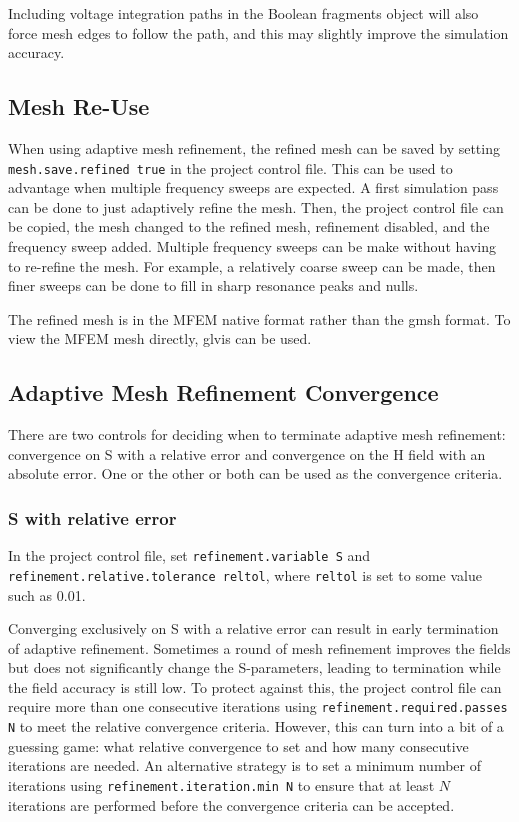 \documentclass[titlepage]{article}
\renewcommand\_{\textunderscore\linebreak[1]}
\begin{document}
Including voltage integration paths in the Boolean fragments object will also force mesh edges to follow the path, and this may slightly improve the simulation accuracy.

\subsection{Mesh Re-Use}

When using adaptive mesh refinement, the refined mesh can be saved by setting \texttt{mesh.save.refined true} in the project control file.  This can be used to advantage when multiple frequency sweeps are expected.  A first simulation pass can be done to just adaptively refine the mesh.  Then, the project control file can be copied, the mesh changed to the refined mesh, refinement disabled, and the frequency sweep added.  Multiple frequency sweeps can be make without having to re-refine the mesh.  For example, a relatively coarse sweep can be made, then finer sweeps can be done to fill in sharp resonance peaks and nulls.

The refined mesh is in the MFEM native format rather than the gmsh format.  To view the MFEM mesh directly, glvis can be used.

\subsection{Adaptive Mesh Refinement Convergence}

There are two controls for deciding when to terminate adaptive mesh refinement: convergence on S with a relative error and convergence on the H field with an absolute error.  One or the other or both can be used as the convergence criteria.

\subsubsection{S with relative error}

In the project control file, set \texttt{refinement.variable S} and \texttt{refinement.relative.tolerance reltol}, where \texttt{reltol} is set to some value such as 0.01.

Converging exclusively on S with a relative error can result in early termination of adaptive refinement.  Sometimes a round of mesh refinement improves the fields but does not significantly change the S-parameters, leading to termination while the field accuracy is still low.  To protect against this, the project control file can require more than one consecutive iterations using \texttt{refinement.required.passes N} to meet the relative convergence criteria.  However, this can turn into a bit of a guessing game: what relative convergence to set and how many consecutive iterations are needed.  An alternative strategy is to set a minimum number of iterations using \texttt{refinement.iteration.min N} to ensure that at least $N$ iterations are performed before the convergence criteria can be accepted.
\end{document}
